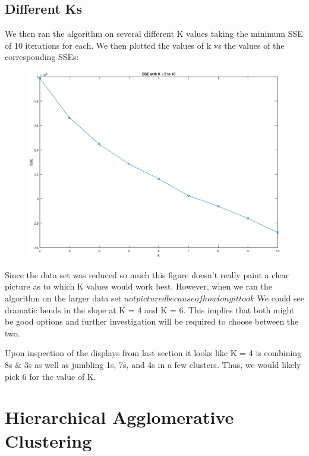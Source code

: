 \documentclass{article}
\begin{document}
	\subsection{Different Ks}
	
	We then ran the algorithm on several different K values taking the minimum SSE of 10 iterations for each. We then plotted the values of k vs the values of the corresponding SSEs:
	
	\begin{figure}[h!]
		\begin{center} 
			\includegraphics[scale=0.4]{diffk.eps} 
		\end{center}  
		\label{fig:M6}
	\end{figure}
\newpage

Since the data set was reduced so much this figure doesn't really paint a clear picture as to which K values would work best. However, when we ran the algorithm on the larger data set \(not pictured because of how long it took\) We could see dramatic bends in the slope at K = 4 and K = 6. This implies that both might be good options and further investigation will be required to choose between the two. 

Upon inspection of the displays from last section it looks like K = 4 is combining 8s \& 3s as well as jumbling 1s, 7s, and 4s in a few clusters. Thus, we would likely pick 6 for the value of K.

\section{Hierarchical Agglomerative Clustering}
\end{document}
